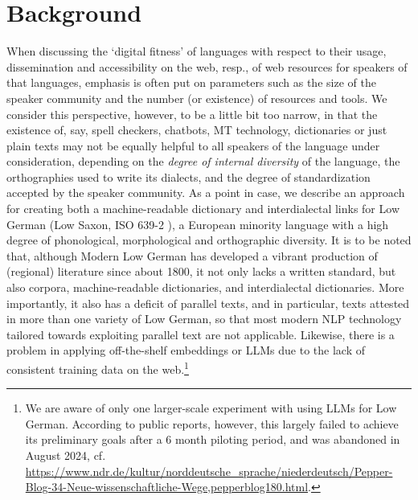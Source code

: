 \section{Background}

When discussing the `digital fitness' of languages \cite{soria2016fostering}
with respect to their usage, dissemination and accessibility on the web, resp., of web resources for speakers of that languages, emphasis is often put on parameters such as the size of the speaker community and the number (or existence) of resources and tools. We consider this perspective, however, to be a little bit too narrow, in that the existence of, say, spell checkers, chatbots, MT technology, dictionaries or just plain texts may not be equally helpful to all speakers of the language under consideration, depending on the \emph{degree of internal diversity} of the language, the orthographies used to write its dialects, and the degree of standardization accepted by the speaker community. As a point in case, we describe an approach for creating both a machine-readable dictionary and interdialectal links for Low German (Low Saxon, ISO 639-2 ), a European minority language with a high degree of phonological, morphological and orthographic diversity. It is to be noted that, although Modern Low German has developed a vibrant production of (regional) literature since about 1800, it not only lacks a written standard, but also corpora, machine-readable dictionaries, and interdialectal dictionaries. More importantly, it also has a deficit of parallel texts, and in particular, texts attested in more than one variety of Low German, so that most modern NLP technology tailored towards exploiting parallel text are not applicable. Likewise, there is a problem in applying off-the-shelf embeddings or LLMs due to the lack of consistent training data on the web.\footnote{
    We are aware of only one larger-scale experiment with using LLMs for Low German. According to public reports, however, this largely failed to achieve its preliminary goals after a 6 month piloting period, and was abandoned in August 2024, cf. \url{https://www.ndr.de/kultur/norddeutsche_sprache/niederdeutsch/Pepper-Blog-34-Neue-wissenschaftliche-Wege,pepperblog180.html}.
}


